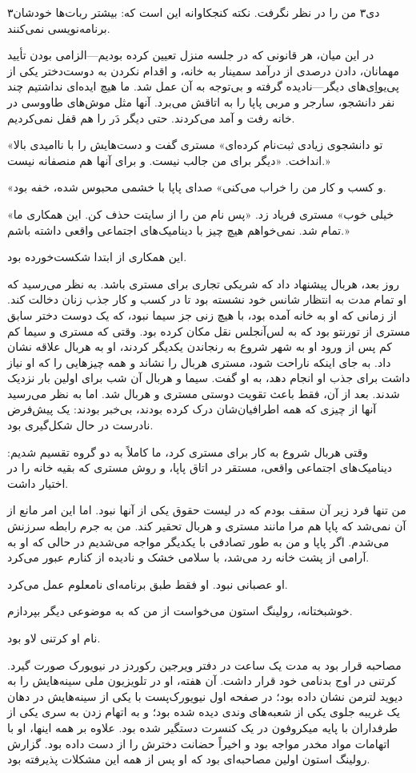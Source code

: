 ۳دی۳ من را در نظر نگرفت. نکته کنجکاوانه این است که: بیشتر ربات‌ها خودشان برنامه‌نویسی نمی‌کنند. 

در این میان، هر قانونی که در جلسه منزل تعیین کرده بودیم—الزامی بودن تأیید مهمانان، دادن درصدی از درآمد سمینار به خانه، و اقدام نکردن به دوست‌دختر یکی از پی‌یو‌اِی‌های دیگر—نادیده گرفته و بی‌توجه به آن عمل شد. ما هیچ ایده‌ای نداشتیم چند نفر دانشجو، سارجر و مربی پاپا را به اتاقش می‌برد. آنها مثل موش‌های طاووسی در خانه رفت و آمد می‌کردند. حتی دیگر دَر را هم قفل نمی‌کردیم.

«تو دانشجوی زیادی ثبت‌نام کرده‌ای» مستری گفت و دست‌هایش را با ناامیدی بالا انداخت. «دیگر برای من جالب نیست. و برای آنها هم منصفانه نیست.» 

«و کسب و کار من را خراب می‌کنی» صدای پاپا با خشمی محبوس شده، خفه بود. 

«خیلی خوب» مستری فریاد زد. «پس نام من را از سایتت حذف کن. این همکاری ما تمام شد. نمی‌خواهم هیچ چیز با دینامیک‌های اجتماعی واقعی داشته باشم.»

این همکاری از ابتدا شکست‌خورده بود. 

روز بعد، هربال پیشنهاد داد که شریکی تجاری برای مستری باشد. به نظر می‌رسید که او تمام مدت به انتظار شانس خود نشسته بود تا در کسب و کار جذب زنان دخالت کند. از زمانی که او به خانه آمده بود، با هیچ زنی جز سیما نبود، که یک دوست دختر سابق مستری از تورنتو بود که به لس‌آنجلس نقل مکان کرده بود. وقتی که مستری و سیما کم کم پس از ورود او به شهر شروع به رنجاندن یکدیگر کردند، او به هربال علاقه نشان داد. به جای اینکه ناراحت شود، مستری هربال را نشاند و همه چیزهایی را که او نیاز داشت برای جذب او انجام دهد، به او گفت. سیما و هربال آن شب برای اولین بار نزدیک شدند. بعد از آن، فقط باعث تقویت دوستی مستری و هربال شد. اما به نظر می‌رسید آنها از چیزی که همه اطرافیان‌شان درک کرده بودند، بی‌خبر بودند: یک پیش‌فرض نادرست در حال شکل‌گیری بود.

وقتی هربال شروع به کار برای مستری کرد، ما کاملاً به دو گروه تقسیم شدیم: دینامیک‌های اجتماعی واقعی، مستقر در اتاق پاپا، و روش مستری که بقیه خانه را در اختیار داشت.

من تنها فرد زیر آن سقف بودم که در لیست حقوق یکی از آنها نبود. اما این امر مانع از آن نمی‌شد که پاپا هم مرا مانند مستری و هربال تحقیر کند. من به جرم رابطه سرزنش می‌شدم. اگر پاپا و من به طور تصادفی با یکدیگر مواجه می‌شدیم در حالی که او به آرامی از پشت خانه رد می‌شد، با سلامی خشک و نادیده از کنارم عبور می‌کرد.

او عصبانی نبود. او فقط طبق برنامه‌ای نامعلوم عمل می‌کرد.

خوشبختانه، رولینگ استون می‌خواست از من که به موضوعی دیگر بپردازم. 

نام او کرتنی لاو بود. 

مصاحبه قرار بود به مدت یک ساعت در دفتر ویرجین رکوردز در نیویورک صورت گیرد. کرتنی در اوج بدنامی خود قرار داشت. آن هفته، او در تلویزیون ملی سینه‌هایش را به دیوید لترمن نشان داده بود؛ در صفحه اول نیویورک‌پست با یکی از سینه‌هایش در دهان یک غریبه جلوی یکی از شعبه‌های وندی دیده شده بود؛ و به اتهام زدن به سری یکی از طرفداران با پایه میکروفون در یک کنسرت دستگیر شده بود. علاوه بر همه اینها، او با اتهامات مواد مخدر مواجه بود و اخیراً حضانت دخترش را از دست داده بود. گزارش رولینگ استون اولین مصاحبه‌ای بود که او پس از همه این مشکلات پذیرفته بود.